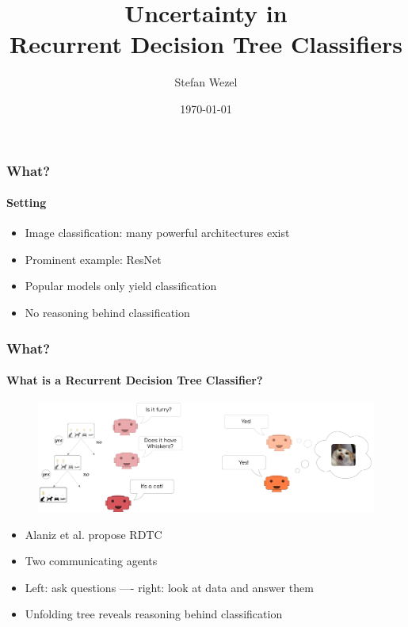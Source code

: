 \documentclass[9pt]{beamer}
\title{Uncertainty in\\Recurrent Decision Tree Classifiers}
\author{Stefan Wezel}
\institute{Explainable Machine Learning}
\date{\today}
\begin{document}
	

\begin{frame}[plain]
	\titlepage
\end{frame} 

\begin{frame}
\frametitle{What?}
\framesubtitle{Setting}
	\begin{itemize}%
	\item Image classification: many powerful architectures exist
	\item Prominent example: ResNet
	\item Popular models only yield classification
	\item No reasoning behind classification
	\end{itemize}
\end{frame} 


\begin{frame}
\frametitle{What?}
\framesubtitle{What is a Recurrent Decision Tree Classifier?}
	\begin{figure}
	\centering
	\includegraphics[width=1\textwidth]{images/rdtc_intuition.pdf}
\end{figure}
\begin{itemize}%
	\item Alaniz et al. \cite{alaniz2019explainable} propose RDTC
	\item Two communicating agents
	\item Left: ask questions ---- right: look at data and answer them
	\item Unfolding tree reveals reasoning behind classification
\end{itemize}
\end{frame} 
\end{document}

